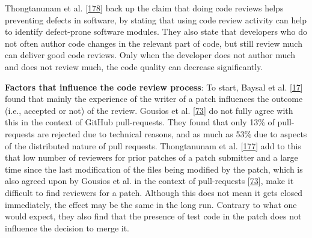 \documentclass[]{book}
\begin{document}
Thongtanunam et al.
{[}\protect\hyperlink{ref-thongtanunam2016revisiting}{178}{]} back up
the claim that doing code reviews helps preventing defects in software,
by stating that using code review activity can help to identify
defect-prone software modules. They also state that developers who do
not often author code changes in the relevant part of code, but still
review much can deliver good code reviews. Only when the developer does
not author much and does not review much, the code quality can decrease
significantly.

\textbf{Factors that influence the code review process}: To start,
Baysal et al. {[}\protect\hyperlink{ref-baysal2016investigating}{17}{]}
found that mainly the experience of the writer of a patch influences the
outcome (i.e., accepted or not) of the review. Gousios et al.
{[}\protect\hyperlink{ref-gousios2014exploratory}{73}{]} do not fully
agree with this in the context of GitHub pull-requests. They found that
only 13\% of pull-requests are rejected due to technical reasons, and as
much as 53\% due to aspects of the distributed nature of pull requests.
Thongtanunam et al.
{[}\protect\hyperlink{ref-thongtanunam2017review}{177}{]} add to this
that low number of reviewers for prior patches of a patch submitter and
a large time since the last modification of the files being modified by
the patch, which is also agreed upon by Gousios et al. in the context of
pull-requests {[}\protect\hyperlink{ref-gousios2014exploratory}{73}{]},
make it difficult to find reviewers for a patch. Although this does not
mean it gets closed immediately, the effect may be the same in the long
run. Contrary to what one would expect, they also find that the presence
of test code in the patch does not influence the decision to merge it.
\end{document}
